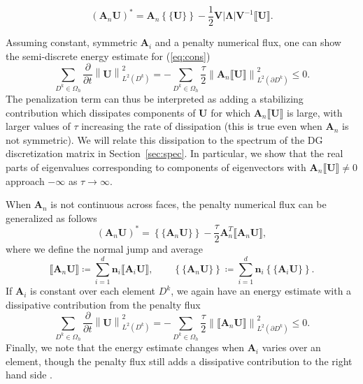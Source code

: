 \documentclass[preprint,10pt]{elsarticle}
\newcommand{\pd}[2]{\frac{\partial#1}{\partial#2}}
\newcommand{\nor}[1]{\left\| #1 \right\|}
\newcommand{\LRp}[1]{\left( #1 \right)}
\newcommand{\LRb}[1]{\left| #1 \right|}
\newcommand{\LRc}[1]{\left\{ #1 \right\}}
\newcommand{\jump}[1] {\ensuremath{\llbracket#1\rrbracket}}
\newcommand{\avg}[1] {\ensuremath{\LRc{\!\{#1\}\!}}}
\newcommand{\Oh}{\Omega_h}
\newcommand{\note}[1]{#1}
\begin{document}
\[
(\bm{A}_n\bm{U})^* = \bm{A}_n\avg{\bm{U}} - \frac{1}{2}\bm{V}\LRb{\bm{\Lambda}}\note{\bm{V}^{-1}} \jump{\bm{U}}.  
\]
\note{
Assuming constant, symmetric $\bm{A}_i$ and a penalty numerical flux, one can show the semi-discrete energy estimate \cite{hesthaven2007nodal, warburton2013low, kopriva2014energy, chan2016weight1} for (\ref{eq:cons})
\[
\sum_{D^k\in \Oh}\pd{}{t}\nor{\bm{U}}^2_{L^2\LRp{D^k}} = -\sum_{D^k \in \Oh} \frac{\tau}{2}\nor{\bm{A}_n\jump{\bm{U}}}^2_{L^2\LRp{\partial D^k}} \leq 0.
\]
The penalization term can thus be interpreted as adding a stabilizing contribution which dissipates components of $\bm{U}$ for which $\bm{A}_n\jump{\bm{U}}$ is large, with larger values of $\tau$ increasing the rate of dissipation (this is true even when $\bm{A}_n$ is not symmetric).  We will relate this dissipation to the spectrum of the DG discretization matrix in Section~\ref{sec:spec}.  In particular, we show that the real parts of eigenvalues corresponding to components of eigenvectors with $\bm{A}_n\jump{\bm{U}}\neq 0$ approach $-\infty$ as $\tau \rightarrow \infty$.  

When $\bm{A}_n$ is not continuous across faces, the penalty numerical flux can be generalized as follows \cite{ye2016discontinuous}
\[
(\bm{A}_n\bm{U})^* = \avg{\bm{A}_n\bm{U}} - \frac{\tau}{2} \bm{A}_n^T \jump{\bm{A}_n\bm{U}},
\]
where we define the normal jump and average
\[
\jump{\bm{A}_n\bm{U}}\coloneqq \sum_{i=1}^d\bm{n}_i \jump{ \bm{A}_i \bm{U}}, \qquad \avg{\bm{A}_n\bm{U}} \coloneqq \sum_{i=1}^d\bm{n}_i\avg{ \bm{A}_i \bm{U}}.
\]
If $\bm{A}_i$ is constant over each element $D^k$, we again have an energy estimate with a dissipative contribution from the penalty flux
\[
\sum_{D^k\in \Oh}\pd{}{t}\nor{\bm{U}}^2_{L^2\LRp{D^k}} = -\sum_{D^k \in \Oh} \frac{\tau}{2}\nor{\jump{\bm{A}_n\bm{U}}}^2_{L^2\LRp{\partial D^k}} \leq 0.
\]
Finally, we note that the energy estimate changes when $\bm{A}_i$ varies over an element, though the penalty flux still adds a dissipative contribution to the right hand side \cite{kopriva2014energy}.  
}
\end{document}
